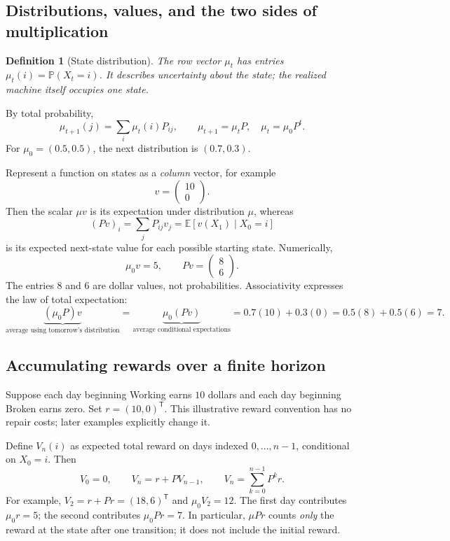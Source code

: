 \documentclass[11pt]{article}
\newtheorem{definition}{Definition}[section]
\theoremstyle{remark}\newtheorem{remark}[definition]{Remark}
\newcommand{\E}{\mathbb E}\newcommand{\Prob}{\mathbb P}
\begin{document}
\clearpage
\subsection{Distributions, values, and the two sides of multiplication}
\begin{definition}[State distribution]
The row vector $\mu_t$ has entries $\mu_t(i)=\Prob(X_t=i)$. It describes uncertainty about the state; the realized machine itself occupies one state.
\end{definition}
By total probability,
\[
\mu_{t+1}(j)=\sum_i\mu_t(i)P_{ij},\qquad
\boxed{\mu_{t+1}=\mu_tP,\quad\mu_t=\mu_0P^t.}
\]
For $\mu_0=(0.5,0.5)$, the next distribution is $(0.7,0.3)$.

Represent a function on states as a \emph{column} vector, for example
\[
v=\begin{pmatrix}10\\0\end{pmatrix}.
\]
Then the scalar $\mu v$ is its expectation under distribution $\mu$, whereas
\[
(Pv)_i=\sum_jP_{ij}v_j=\E[v(X_1)\mid X_0=i]
\]
is its expected next-state value for each possible starting state. Numerically,
\[
\mu_0v=5,\qquad Pv=\begin{pmatrix}8\\6\end{pmatrix}.
\]
The entries $8$ and $6$ are dollar values, not probabilities. Associativity expresses the law of total expectation:
\[
\underbrace{(\mu_0P)v}_{\text{average using tomorrow's distribution}}
=\underbrace{\mu_0(Pv)}_{\text{average conditional expectations}}
=0.7(10)+0.3(0)=0.5(8)+0.5(6)=7.
\]

\subsection{Accumulating rewards over a finite horizon}
Suppose each day beginning Working earns $10$ dollars and each day beginning Broken earns zero. Set $r=(10,0)^{\mathsf T}$. This illustrative reward convention has no repair costs; later examples explicitly change it.

Define $V_n(i)$ as expected total reward on days indexed $0,\ldots,n-1$, conditional on $X_0=i$. Then
\[
V_0=0,\qquad V_n=r+PV_{n-1},\qquad
\boxed{V_n=\sum_{k=0}^{n-1}P^kr.}
\]
For example, $V_2=r+Pr=(18,6)^{\mathsf T}$ and $\mu_0V_2=12$.
The first day contributes $\mu_0r=5$; the second contributes $\mu_0Pr=7$.
In particular, $\mu Pr$ counts \emph{only} the reward at the state after one transition; it does not include the initial reward.
\end{document}
